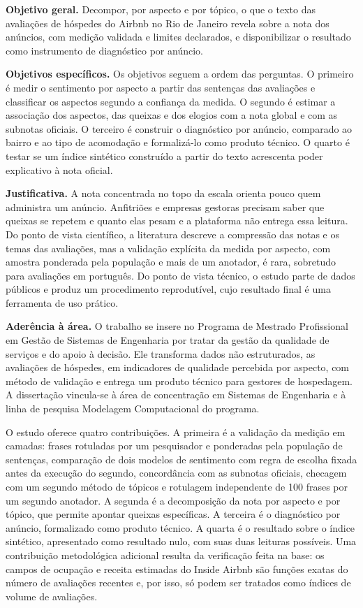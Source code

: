 \textbf{Objetivo geral.} Decompor, por aspecto e por tópico, o que o texto das avaliações de hóspedes do Airbnb no Rio de Janeiro revela sobre a nota dos anúncios, com medição validada e limites declarados, e disponibilizar o resultado como instrumento de diagnóstico por anúncio.

\textbf{Objetivos específicos.} Os objetivos seguem a ordem das perguntas. O primeiro é medir o sentimento por aspecto a partir das sentenças das avaliações e classificar os aspectos segundo a confiança da medida. O segundo é estimar a associação dos aspectos, das queixas e dos elogios com a nota global e com as subnotas oficiais. O terceiro é construir o diagnóstico por anúncio, comparado ao bairro e ao tipo de acomodação e formalizá-lo como produto técnico. O quarto é testar se um índice sintético construído a partir do texto acrescenta poder explicativo à nota oficial.

\textbf{Justificativa.} A nota concentrada no topo da escala orienta pouco quem administra um anúncio. Anfitriões e empresas gestoras precisam saber que queixas se repetem e quanto elas pesam e a plataforma não entrega essa leitura. Do ponto de vista científico, a literatura descreve a compressão das notas e os temas das avaliações, mas a validação explícita da medida por aspecto, com amostra ponderada pela população e mais de um anotador, é rara, sobretudo para avaliações em português. Do ponto de vista técnico, o estudo parte de dados públicos e produz um procedimento reprodutível, cujo resultado final é uma ferramenta de uso prático.

\textbf{Aderência à área.} O trabalho se insere no Programa de Mestrado Profissional em Gestão de Sistemas de Engenharia por tratar da gestão da qualidade de serviços e do apoio à decisão. Ele transforma dados não estruturados, as avaliações de hóspedes, em indicadores de qualidade percebida por aspecto, com método de validação e entrega um produto técnico para gestores de hospedagem. A dissertação vincula-se à área de concentração em Sistemas de Engenharia e à linha de pesquisa Modelagem Computacional do programa.

O estudo oferece quatro contribuições. A primeira é a validação da medição em camadas: frases rotuladas por um pesquisador e ponderadas pela população de sentenças, comparação de dois modelos de sentimento com regra de escolha fixada antes da execução do segundo, concordância com as subnotas oficiais, checagem com um segundo método de tópicos e rotulagem independente de 100 frases por um segundo anotador. A segunda é a decomposição da nota por aspecto e por tópico, que permite apontar queixas específicas. A terceira é o diagnóstico por anúncio, formalizado como produto técnico. A quarta é o resultado sobre o índice sintético, apresentado como resultado nulo, com suas duas leituras possíveis. Uma contribuição metodológica adicional resulta da verificação feita na base: os campos de ocupação e receita estimadas do Inside Airbnb são funções exatas do número de avaliações recentes e, por isso, só podem ser tratados como índices de volume de avaliações.

